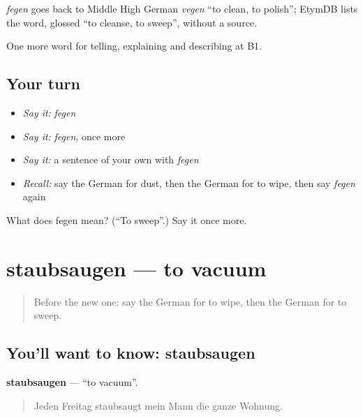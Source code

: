 \begin{cousinweb}
\emph{fegen} goes back to Middle High German \emph{vegen} \textquotedblleft{}to clean, to polish\textquotedblright{}; EtymDB lists the word, glossed \textquotedblleft{}to cleanse, to sweep\textquotedblright{}, without a source.
\end{cousinweb}

\begin{grammarlens}[title={What you've built}]
One more word for telling, explaining and describing at B1.
\end{grammarlens}

\subsection*{Your turn}
\begin{itemize}
\raggedright
  \item \emph{Say it:} \emph{fegen}
  \item \emph{Say it:} \emph{fegen}, once more
  \item \emph{Say it:} a sentence of your own with \emph{fegen}
  \item \emph{Recall:} say the German for dust, then the German for to wipe, then say \emph{fegen} again
\end{itemize}

\begin{tcolorbox}[breakable,colback=teal!4,colframe=teal!35!black,title={Before you move on}]
What does fegen mean? (\textquotedblleft{}To sweep\textquotedblright{}.) Say it once more.
\end{tcolorbox}
\section[staubsaugen]{staubsaugen — to vacuum}

\label{lesson:GE-C526-staubsaugen}



\begin{quote}
Before the new one: say the German for to wipe, then the German for to sweep.
\end{quote}

\subsection*{You'll want to know: staubsaugen}
\textbf{staubsaugen} — \textquotedblleft{}to vacuum\textquotedblright{}.

\begin{quote}
Jeden Freitag staubsaugt mein Mann die ganze Wohnung.
\end{quote}

